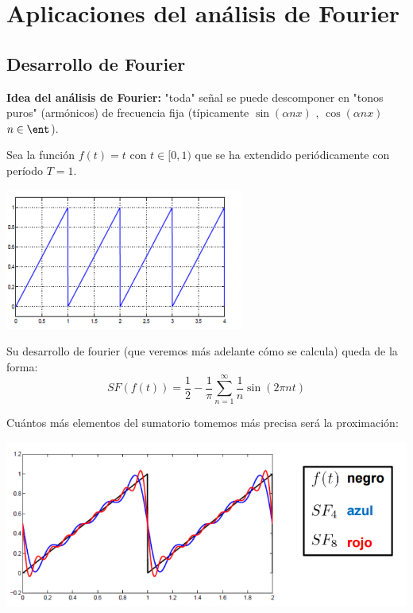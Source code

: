 
\chapter{Aplicaciones del análisis de Fourier}
\section{Desarrollo de Fourier}
\textbf{Idea del análisis de Fourier:} "toda" señal se puede descomponer en "tonos puros" (armónicos) de frecuencia fija (típicamente $\sin(\alpha n x)$ , $\cos(\alpha n x)$  $ n \in \ent$).


\begin{example}
Sea la función $f(t)=t$ con $t\in[0,1)$ que se ha extendido periódicamente con período $T=1$.

\begin{center}
\includegraphics[width=\linewidth]{img/id_period.png}
\end{center}

Su desarrollo de fourier (que veremos más adelante cómo se calcula) queda de la forma:
\[SF(f(t))=\frac{1}{2}-\frac{1}{π}\sum_{n=1}^{\infty}\frac{1}{n}\sin(2πnt)\]

Cuántos más elementos del sumatorio tomemos más precisa será la proximación:

\begin{center}
\includegraphics[width=\linewidth]{img/id_period_fourier.png}
\end{center}

\end{example}


